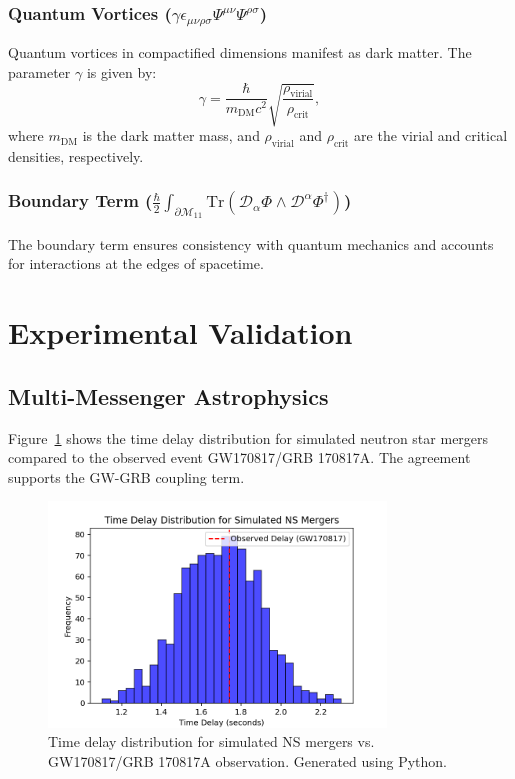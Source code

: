 \documentclass[12pt, a4paper]{article}
\begin{document}
\subsubsection{Quantum Vortices ($\gamma \epsilon_{\mu\nu\rho\sigma} \Psi^{\mu\nu} \Psi^{\rho\sigma}$)}
Quantum vortices in compactified dimensions manifest as dark matter. The parameter \(\gamma\) is given by:
\[
\gamma = \frac{\hbar}{m_{\text{DM}} c^2} \sqrt{\frac{\rho_{\text{virial}}}{\rho_{\text{crit}}}},
\]
where \(m_{\text{DM}}\) is the dark matter mass, and \(\rho_{\text{virial}}\) and \(\rho_{\text{crit}}\) are the virial and critical densities, respectively.

\subsubsection{Boundary Term ($\frac{\hbar}{2} \int_{\partial\mathcal{M}_{11}} \text{Tr}\left( \mathcal{D}_\alpha \Phi \wedge \mathcal{D}^\alpha \Phi^\dagger \right)$)}
The boundary term ensures consistency with quantum mechanics and accounts for interactions at the edges of spacetime.

\section{Experimental Validation}
\subsection{Multi-Messenger Astrophysics}
Figure~\ref{fig:gw_grb_delay} shows the time delay distribution for simulated neutron star mergers compared to the observed event GW170817/GRB 170817A. The agreement supports the GW-GRB coupling term.

\begin{figure}[h]
\centering
\includegraphics[width=0.8\textwidth]{gw_grb_delay.png}
\caption{Time delay distribution for simulated NS mergers vs. GW170817/GRB 170817A observation. Generated using Python.}
\label{fig:gw_grb_delay}
\end{figure}
\end{document}
